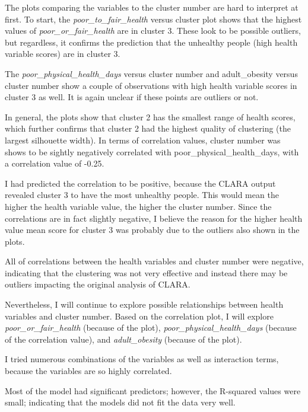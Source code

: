 \documentclass[12pt,twoside]{amherstthesis}
\begin{document}
  The plots comparing the variables to the cluster number are hard to
  interpret at first. To start, the \emph{poor\_to\_fair\_health} versus
  cluster plot shows that the highest values of
  \emph{poor\_or\_fair\_health} are in cluster 3. These look to be
  possible outliers, but regardless, it confirms the prediction that the
  unhealthy people (high health variable scores) are in cluster 3.
  
  The \emph{poor\_physical\_health\_days} versus cluster number and
  adult\_obesity versus cluster number show a couple of observations with
  high health variable scores in cluster 3 as well. It is again unclear if
  these points are outliers or not.
  
  In general, the plots show that cluster 2 has the smallest range of
  health scores, which further confirms that cluster 2 had the highest
  quality of clustering (the largest silhouette width). In terms of
  correlation values, cluster number was shows to be sightly negatively
  correlated with poor\_physical\_health\_days, with a correlation value
  of -0.25.
  
  I had predicted the correlation to be positive, because the CLARA output
  revealed cluster 3 to have the most unhealthy people. This would mean
  the higher the health variable value, the higher the cluster number.
  Since the correlations are in fact slightly negative, I believe the
  reason for the higher health value mean score for cluster 3 was probably
  due to the outliers also shown in the plots.
  
  All of correlations between the health variables and cluster number were
  negative, indicating that the clustering was not very effective and
  instead there may be outliers impacting the original analysis of CLARA.
  
  Nevertheless, I will continue to explore possible relationships between
  health variables and cluster number. Based on the correlation plot, I
  will explore \emph{poor\_or\_fair\_health} (because of the plot),
  \emph{poor\_physical\_health\_days} (because of the correlation value),
  and \emph{adult\_obesity} (because of the plot).
  
  I tried numerous combinations of the variables as well as interaction
  terms, because the variables are so highly correlated.
  
  Most of the model had significant predictors; however, the R-squared
  values were small; indicating that the models did not fit the data very
  well.
  
\end{document}

